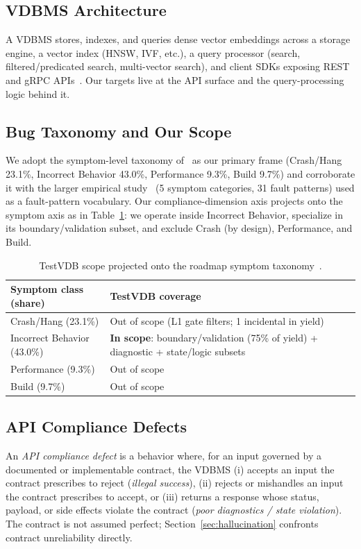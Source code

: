 \documentclass[sigconf, anonymous, review]{acmart}
\begin{document}
\subsection{VDBMS Architecture}
A VDBMS stores, indexes, and queries dense vector embeddings across a storage engine, a vector index (HNSW, IVF, etc.), a query processor (search, filtered/predicated search, multi-vector search), and client SDKs exposing REST and gRPC APIs~\cite{roadmap25}. Our targets live at the API surface and the query-processing logic behind it.

\subsection{Bug Taxonomy and Our Scope}
We adopt the symptom-level taxonomy of~\cite{roadmap25} as our primary frame (Crash/Hang 23.1\%, Incorrect Behavior 43.0\%, Performance 9.3\%, Build 9.7\%) and corroborate it with the larger empirical study~\cite{bugstudy25} (5 symptom categories, 31 fault patterns) used as a fault-pattern vocabulary. Our compliance-dimension axis projects onto the symptom axis as in Table~\ref{tab:scope}: we operate inside Incorrect Behavior, specialize in its boundary/validation subset, and exclude Crash (by design), Performance, and Build.

\begin{table}[t]
\caption{TestVDB scope projected onto the roadmap symptom taxonomy~\cite{roadmap25}.}
\label{tab:scope}
\small
\begin{tabular}{@{}p{}p{}@{}}
\toprule
Symptom class (share) & TestVDB coverage \\
\midrule
Crash/Hang (23.1\%) & Out of scope (L1 gate filters; 1 incidental in yield) \\
Incorrect Behavior (43.0\%) & \textbf{In scope}: boundary/validation (75\% of yield) + diagnostic + state/logic subsets \\
Performance (9.3\%) & Out of scope \\
Build (9.7\%) & Out of scope \\
\bottomrule
\end{tabular}
\end{table}

\subsection{API Compliance Defects}
An \emph{API compliance defect} is a behavior where, for an input governed by a documented or implementable contract, the VDBMS (i) accepts an input the contract prescribes to reject (\emph{illegal success}), (ii) rejects or mishandles an input the contract prescribes to accept, or (iii) returns a response whose status, payload, or side effects violate the contract (\emph{poor diagnostics / state violation}). The contract is not assumed perfect; Section~\ref{sec:hallucination} confronts contract unreliability directly.
\end{document}
